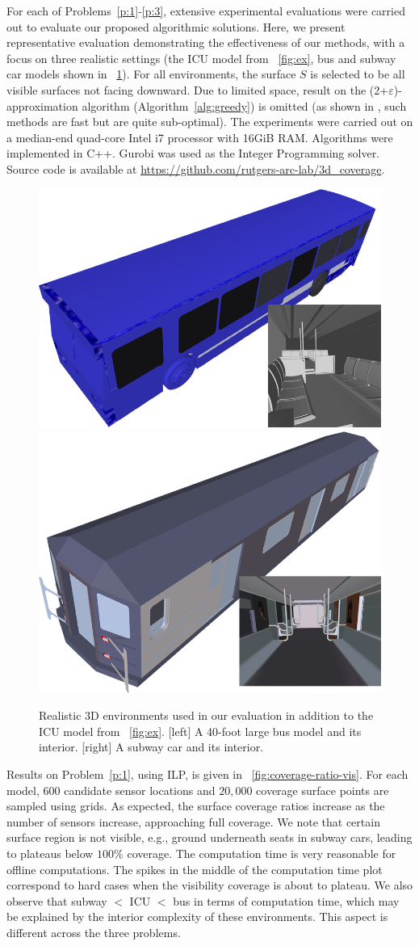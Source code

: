 For each of Problems~\ref{p:1}-\ref{p:3}, extensive experimental evaluations were carried out to evaluate our proposed algorithmic solutions. Here, we present representative evaluation demonstrating the effectiveness of our methods, with a focus on three realistic settings (the ICU model from ~\ref{fig:ex}, bus and subway car models shown in ~\ref{fig:bus-subway}). %
For all environments, the surface $S$ is selected to be all visible surfaces not facing downward.
Due to limited space, result on the (2+$\varepsilon$)-approximation algorithm (Algorithm~\ref{alg:greedy}) is omitted (as shown in \cite{fengyu2020optimally}, such methods are fast but are quite sub-optimal). The experiments were carried out on a median-end quad-core Intel i7 processor with 16GiB RAM. 
Algorithms were implemented in C++. Gurobi \cite{optimization2019gurobi} was used as the Integer Programming solver. 
Source code is available at 
{\small \url{https://github.com/rutgers-arc-lab/3d_coverage}}.

\begin{figure}[!ht]
    \centering
    \includegraphics[width = .4\columnwidth]{chapters/surf/fig/bus.png}\hspace{3mm}
    \includegraphics[width = .4\columnwidth]{chapters/surf/fig/subway.png}
    \caption{Realistic 3D environments used in our evaluation in addition to the ICU model from ~\ref{fig:ex}. [left] A 40-foot large bus model and its interior. [right] A subway car and its interior.}
    \label{fig:bus-subway}
\end{figure}

Results on Problem~\ref{p:1}, using ILP, is given in ~\ref{fig:coverage-ratio-vis}. 
For each model, $600$ candidate sensor locations and $20,000$ coverage surface points are sampled using grids. 
As expected, the surface coverage ratios increase as the number of sensors increase, approaching full coverage. We note that certain surface region is not visible, e.g., ground underneath seats in subway cars, leading to plateaus below $100\%$ coverage. The computation time is very reasonable for offline computations. The spikes in the middle of the computation time plot correspond to hard cases when the visibility coverage is about to plateau. We also observe that subway $<$ ICU $<$ bus in terms 
of computation time, which may be explained by the interior complexity of these environments. This aspect is different across the three problems.

